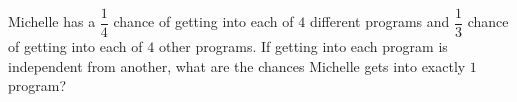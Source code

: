 Michelle has a $\dfrac{1}{4}$ chance of getting into each of $4$ different programs and $\dfrac{1}{3}$ chance of getting into each of $4$ other programs. If getting into each program is independent from another, what are the chances Michelle gets into exactly $1$ program?
